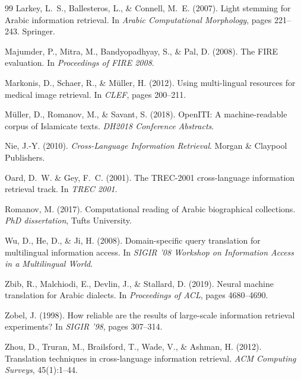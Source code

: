 \documentclass[preprint,12pt,authoryear]{elsarticle}
\begin{document}
\begin{thebibliography}{99}
Larkey, L.~S., Ballesteros, L., \& Connell, M.~E. (2007).
\newblock Light stemming for Arabic information retrieval.
\newblock In \textit{Arabic Computational Morphology}, pages 221--243. Springer.

Majumder, P., Mitra, M., Bandyopadhyay, S., \& Pal, D. (2008).
\newblock The FIRE evaluation.
\newblock In \textit{Proceedings of FIRE 2008}.

Markonis, D., Schaer, R., \& M{\"u}ller, H. (2012).
\newblock Using multi-lingual resources for medical image retrieval.
\newblock In \textit{CLEF}, pages 200--211.

M{\"u}ller, D., Romanov, M., \& Savant, S. (2018).
\newblock OpenITI: A machine-readable corpus of Islamicate texts.
\newblock \textit{DH2018 Conference Abstracts}.

Nie, J.-Y. (2010).
\newblock \textit{Cross-Language Information Retrieval}.
\newblock Morgan \& Claypool Publishers.

Oard, D.~W. \& Gey, F.~C. (2001).
\newblock The TREC-2001 cross-language information retrieval track.
\newblock In \textit{TREC 2001}.

Romanov, M. (2017).
\newblock Computational reading of Arabic biographical collections.
\newblock \textit{PhD dissertation}, Tufts University.

Wu, D., He, D., \& Ji, H. (2008).
\newblock Domain-specific query translation for multilingual information access.
\newblock In \textit{SIGIR '08 Workshop on Information Access in a Multilingual World}.

Zbib, R., Malchiodi, E., Devlin, J., \& Stallard, D. (2019).
\newblock Neural machine translation for Arabic dialects.
\newblock In \textit{Proceedings of ACL}, pages 4680--4690.

Zobel, J. (1998).
\newblock How reliable are the results of large-scale information retrieval experiments?
\newblock In \textit{SIGIR '98}, pages 307--314.

Zhou, D., Truran, M., Brailsford, T., Wade, V., \& Ashman, H. (2012).
\newblock Translation techniques in cross-language information retrieval.
\newblock \textit{ACM Computing Surveys}, 45(1):1--44.

\end{thebibliography}
\end{document}

